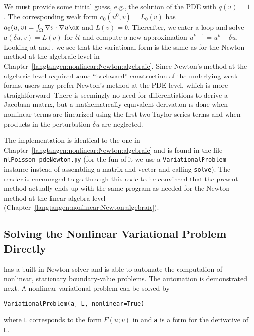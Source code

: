 We must provide some initial guess, e.g., the solution of the
PDE with $q(u)=1$. The corresponding weak form $a_0(u^0,v)=L_0(v)$
has $a_0(u,v)=\int_\Omega\nabla v\cdot\nabla u\dx$
and $L(v)=0$. Thereafter, we enter a loop and solve
$a(\delta u,v)=L(v)$ for $\delta t$ and compute a new approximation
$u^{k+1} = u^k + \delta u$.
Looking at  and
, we see that the variational
form is the same as for the Newton method at the algebraic level
in Chapter~\ref{langtangen:nonlinear:Newton:algebraic}. Since Newton's method
at the algebraic level required some ``backward'' construction of the
underlying weak forms, \fenics{} users may prefer Newton's method at
the PDE level, which is more straightforward.
There is seemingly no need for differentiations to derive
a Jacobian matrix,
but a mathematically equivalent derivation is done when nonlinear terms are
linearized using the first two Taylor series terms and when 
products in the perturbation $\delta u$ are neglected.

The implementation is identical to the one in 
Chapter~\ref{langtangen:nonlinear:Newton:algebraic} and is found in
the file {\fontsize{12pt}{12pt}\verb!nlPoisson_pdeNewton.py!} (for the fun of it we use
a {\fontsize{12pt}{12pt}\texttt{VariationalProblem}} instance instead of assembling a matrix and
vector and calling {\fontsize{12pt}{12pt}\texttt{solve}}). The reader is encouraged to go
through this code to be convinced that the present method actually
ends up with the same program as needed for the Newton method at
the linear algebra level (Chapter~\ref{langtangen:nonlinear:Newton:algebraic}).


\subsection{Solving the Nonlinear Variational Problem Directly}
\label{langtangen:nonlinear:Newton:auto}

\dolfin{} has a built-in Newton solver and is able to automate the
computation of nonlinear, stationary boundary-value problems.
The automation is demonstrated next. A nonlinear variational
problem  can be solved by
\begin{Verbatim}[fontsize=\fontsize{10pt}{10pt},tabsize=8,baselinestretch=1.05,
fontfamily=tt,xleftmargin=7mm]
VariationalProblem(a, L, nonlinear=True)
\end{Verbatim}
\noindent
where {\fontsize{12pt}{12pt}\texttt{L}} corresponds to the form $F(u;v)$ in
 and {\fontsize{12pt}{12pt}\texttt{a}} is
a form for the derivative of {\fontsize{12pt}{12pt}\texttt{L}}.

